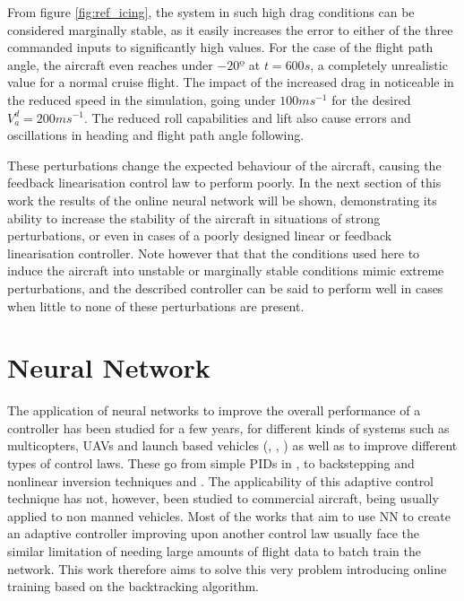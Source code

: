 From figure \ref{fig:ref_icing}, the system in such high drag conditions can be considered marginally stable, as it easily increases the error to either of the three commanded inputs to significantly high values. For the case of the flight path angle, the aircraft even reaches under $-20º$ at $t=600s$, a completely unrealistic value for a normal cruise flight. The impact of the increased drag in noticeable in the reduced speed in the simulation, going under $100ms^{-1}$ for the desired $V_a^d=200ms^{-1}$. The reduced roll capabilities and lift also cause errors and oscillations in heading and flight path angle following.



These perturbations change the expected behaviour of the aircraft, causing the feedback linearisation control law to perform poorly. In the next section of this work the results of the online neural network will be shown, demonstrating its ability to increase the stability of the aircraft in situations of strong perturbations, or even in cases of a poorly designed linear or feedback linearisation controller. Note however that that the conditions used here to induce the aircraft into unstable or marginally stable conditions mimic extreme perturbations, and the described controller can be said to perform well in cases when little to none of these perturbations are present.


\section{Neural Network}
\label{section:results/NN}

The application of neural networks to improve the overall performance of a controller has been studied for a few years, for different kinds of systems such as multicopters, UAVs and launch based vehicles (\cite{quad_NLI+NN}, \cite{YANG+LIN_Adaptive_Flight_Control}, \cite{NN_PID2}) as well as to improve different types of control laws. These go from simple PIDs in \cite{NN_PID}, \cite{NN_PID2} to  backstepping and nonlinear inversion techniques \cite{NN_backlash} and \citep{NN_NLI}. The applicability of this adaptive control technique has not, however, been studied to commercial aircraft, being usually applied to non manned vehicles. Most of the works that aim to use NN to create an adaptive controller improving upon another control law usually face the similar limitation of needing large amounts of flight data to batch train the network. This work therefore aims to solve this very problem introducing online training based on the backtracking algorithm. 

